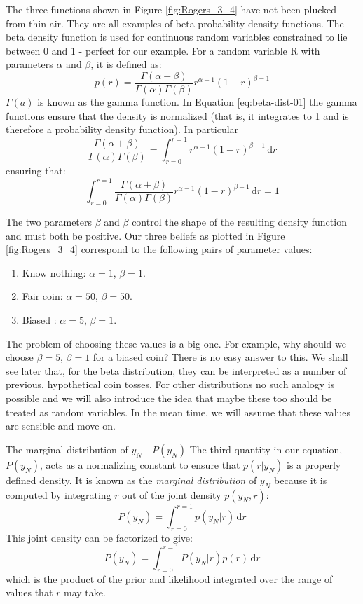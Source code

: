 The three functions shown in Figure \ref{fig:Rogers_3_4} have not been plucked from thin air.
They are all examples of beta probability density functions. The
beta density function is used for continuous random variables constrained to lie
between 0 and 1 - perfect for our example. For a random variable R with parameters
$\alpha$ and $\beta$, it is defined as:
\begin{equation}
p(r) = \frac{\Gamma(\alpha + \beta)}{\Gamma(\alpha)\Gamma(\beta)}
r^{\alpha - 1} (1 - r)^{\beta - 1}
\label{eq:beta-dist-01}
\end{equation}
$\Gamma(a)$ is known as the gamma function.
In Equation \eqref{eq:beta-dist-01} the gamma
functions ensure that the density is normalized (that is, it integrates to 1 and is
therefore a probability density function). In particular
\begin{equation*}
\frac{\Gamma(\alpha + \beta)}{\Gamma(\alpha)\Gamma(\beta)} =
\int_{r=0}^{r=1} r^{\alpha - 1} (1 - r)^{\beta - 1}\, \mathrm{d}r
\end{equation*}
ensuring that:
\begin{equation*}
\int_{r=0}^{r=1}
\frac{\Gamma(\alpha + \beta)}{\Gamma(\alpha)\Gamma(\beta)}
r^{\alpha - 1} (1 - r)^{\beta - 1}\, \mathrm{d}r = 1
\end{equation*}

The two parameters $\beta$ and $\beta$ control the shape of the
resulting density function
and must both be positive. Our three beliefs as plotted in Figure \ref{fig:Rogers_3_4}
correspond to
the following pairs of parameter values:
\begin{enumerate}
\item Know nothing: $\alpha = 1$, $\beta = 1$.
\item Fair coin: $\alpha = 50$, $\beta = 50$.
\item Biased : $\alpha = 5$, $\beta = 1$.
\end{enumerate}
The problem of choosing these values is a big one. For example, why should we
choose $\beta = 5$, $\beta = 1$ for a biased coin?
There is no easy answer to this. We shall see
later that, for the beta distribution, they can be interpreted as a number of previous,
hypothetical coin tosses. For other distributions no such analogy is possible and
we will also introduce the idea that maybe these too should be treated as random
variables. In the mean time, we will assume that these values are sensible and move on.


The marginal distribution of $y_N$ - $P(y_N)$ The third quantity in our equation,
$P(y_N)$, acts as a normalizing constant to ensure that $p(r|y_N)$ is a properly
defined density. It is known as the \emph{marginal distribution} of $y_N$ because it is
computed by integrating $r$ out of the joint density $p(y_N,r)$:
\begin{equation*}
P(y_N) = \int_{r=0}^{r=1} p(y_N|r) \, \mathrm{d}r
\end{equation*}
This joint density can be factorized to give:
\begin{equation*}
P(y_N) = \int_{r=0}^{r=1} P(y_N|r) p(r) \, \mathrm{d}r
\end{equation*}
which is the product of the prior and likelihood integrated over the range of values
that $r$ may take.

